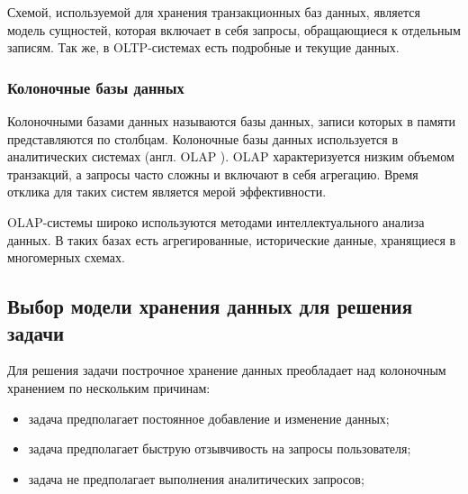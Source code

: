 Схемой, используемой для хранения транзакционных баз данных, является модель сущностей, которая включает в себя запросы, обращающиеся к отдельным записям. Так же, в OLTP-системах есть подробные и текущие данных.\\

\subsubsection{Колоночные базы данных}

Колоночными базами данных называются базы данных, записи которых в памяти представляются по столбцам. Колоночные базы данных используется в аналитических системах (англ. OLAP \cite{OLAP}). OLAP характеризуется низким объемом транзакций, а запросы часто сложны и включают в себя агрегацию. Время отклика для таких систем является мерой эффективности.

OLAP-системы широко используются методами интеллектуального анализа данных. В таких базах есть агрегированные, исторические данные, хранящиеся в многомерных схемах.

\subsection{Выбор модели хранения данных для решения задачи}

Для решения задачи построчное хранение данных преобладает над колоночным хранением по нескольким причинам:

\begin{itemize}
    \item задача предполагает постоянное добавление и изменение данных;
    \item задача предполагает быструю отзывчивость на запросы пользователя;
    \item задача не предполагает выполнения аналитических запросов;
\end{itemize}

